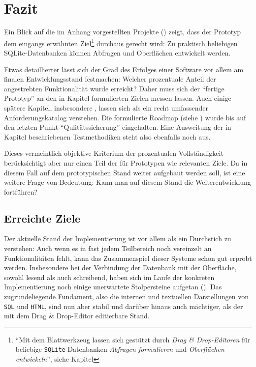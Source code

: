 \section{Fazit}
\label{sec:conclusion}

Ein Blick auf die im Anhang vorgestellten Projekte () zeigt, dass der Prototyp dem eingangs erwähnten Ziel\footnote{"`Mit dem Blattwerkzeug lassen sich gestützt durch \textit{Drag \& Drop-Editoren} für beliebige \texttt{SQLite}-Datenbanken \textit{Abfragen formulieren} und \textit{Oberflächen entwickeln}"', siehe Kapitel } durchaus gerecht wird: Zu praktisch beliebigen SQLite-Datenbanken können Abfragen und Oberflächen entwickelt werden.

Etwas detaillierter lässt sich der Grad des Erfolges einer Software vor allem am finalen Entwicklungsstand festmachen: Welcher prozentuale Anteil der angestrebten Funktionalität wurde erreicht? Daher muss sich der "`fertige Prototyp"' an den in Kapitel  formulierten Zielen messen lassen. Auch einige spätere Kapitel, insbesondere , lassen sich als ein recht umfassender Anforderungskatalog verstehen. Die formulierte Roadmap (siehe ) wurde bis auf den letzten Punkt "`Qulitätssicherung"' eingehalten. Eine Ausweitung der in Kapitel  beschriebenen Testmethodiken steht also ebenfalls noch aus.

Dieses vermeintlich objektive Kriterium der prozentualen Vollständigkeit berücksichtigt aber nur einen Teil der für Prototypen wie  \idename{} relevanten Ziele. Da in diesem Fall auf dem prototypischen Stand weiter aufgebaut werden soll, ist eine weitere Frage von Bedeutung: Kann man auf diesem Stand die Weiterentwicklung fortführen?

\subsection{Erreichte Ziele}

Der aktuelle Stand der Implementierung ist vor allem als ein Durchstich zu verstehen: Auch wenn es in fast jedem Teilbereich noch vereinzelt an Funktionalitäten fehlt, kann das Zusammenspiel dieser Systeme schon gut erprobt werden. Insbesondere bei der Verbindung der Datenbank mit der Oberfläche, sowohl lesend als auch schreibend, haben sich im Laufe der konkreten Implementierung noch einige unerwartete Stolpersteine aufgetan (). Das zugrundeliegende Fundament, also die internen und textuellen Darstellungen von \texttt{SQL} und \texttt{HTML}, sind nun aber stabil und darüber hinaus auch mächtiger, als der mit dem Drag \& Drop-Editor editierbare Stand.

